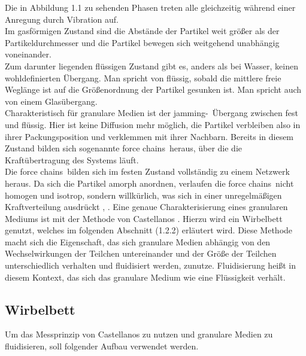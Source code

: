 Die in Abbildung 1.1 zu sehenden Phasen treten alle gleichzeitig während einer Anregung durch Vibration auf. \\
Im gasförmigen Zustand sind die Abstände der Partikel weit größer als der Partikeldurchmesser und die Partikel bewegen sich weitgehend unabhängig voneinander. \\
Zum darunter liegenden flüssigen Zustand gibt es, anders als bei Wasser, keinen wohldefinierten Übergang. Man spricht von flüssig, sobald die mittlere freie Weglänge ist auf die Größenordnung der Partikel gesunken ist. Man spricht auch von einem Glasübergang. \\
Charakteristisch für granulare Medien ist der \glqq jamming\grqq-\ Übergang zwischen fest und flüssig. Hier ist keine Diffusion mehr möglich, die Partikel verbleiben also in ihrer Packungsposition und verklemmen mit ihrer Nachbarn. Bereits in diesem Zustand bilden sich sogenannte \glqq force chains\grqq \ heraus, über die die Kraftübertragung des Systems läuft. \\
Die \glqq force chains\grqq \ bilden sich im festen Zustand vollständig zu einem Netzwerk heraus. Da sich die Partikel amorph anordnen, verlaufen die \glqq force chains\grqq \ nicht homogen und isotrop, sondern willkürlich, was sich in einer unregelmäßigen Kraftverteilung ausdrückt \cite{Darmstadt2015}, \cite{Fallturmexperiment}.
Eine genaue Charakterisierung eines granularen Mediums ist mit der Methode von Castellanos \cite{Castellanos2000}. Hierzu wird ein Wirbelbett genutzt, welches im folgenden Abschnitt (1.2.2) erläutert wird. Diese Methode macht sich die Eigenschaft, das sich granulare Medien abhängig von den Wechselwirkungen der Teilchen untereinander und der Größe der Teilchen unterschiedlich verhalten und fluidisiert werden, zunutze. Fluidisierung heißt in diesem Kontext, das sich das granulare Medium wie eine Flüssigkeit verhält.

\subsection{Wirbelbett}

Um das Messprinzip von Castellanos zu nutzen und granulare Medien zu fluidisieren, soll folgender Aufbau verwendet werden.


